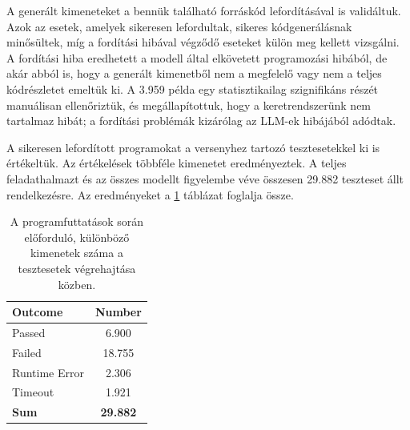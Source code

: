 \documentclass[12pt,a4paper]{extarticle}
\begin{document}
A generált kimeneteket a bennük található forráskód lefordításával is validáltuk.
Azok az esetek, amelyek sikeresen lefordultak, sikeres kódgenerálásnak minősültek, míg a for\-dí\-tá\-si hibával végződő eseteket külön meg kellett vizsgálni.
A fordítási hiba eredhetett a modell által elkövetett programozási hibából, de akár abból is, hogy a generált kimenetből nem a megfelelő vagy nem a teljes kódrészletet emeltük ki.
A 3.959 példa egy statisztikailag szignifikáns részét manuálisan ellenőriztük, és megállapítottuk, hogy a keretrendszerünk nem tartalmaz hibát; a fordítási problémák kizárólag az LLM-ek hibájából adódtak.


A sikeresen lefordított programokat a versenyhez tartozó tesztesetekkel ki is értékeltük.
Az értékelések többféle kimenetet eredményeztek.
A teljes feladathalmazt és az összes modellt figyelembe véve összesen 29.882 teszteset állt rendelkezésre.
Az eredményeket a \ref{th4:table:outcomes} táblázat foglalja össze.



\begin{table}[h]
	\centering
	\begin{tabular}{|l|c|}
		\hline
		\textbf{Outcome} & \textbf{Number}  \\ \hline
		Passed           & 6.900            \\ \hline
		Failed           & 18.755           \\ \hline
		Runtime Error    & 2.306            \\ \hline
		Timeout          & 1.921            \\ \hline
		\textbf{Sum}     & \textbf{29.882}  \\ \hline
	\end{tabular}
	\caption{A programfuttatások során előforduló, különböző kimenetek száma a tesztesetek végrehajtása közben.}
	\label{th4:table:outcomes}
\end{table}
\end{document}
